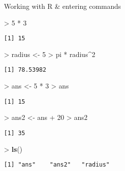 \documentclass[10pt,ignorenonframetext,compress, aspectratio=169]{beamer}
\newenvironment{Shaded}{\begin{snugshade}}{\end{snugshade}}
\newcommand{\KeywordTok}[1]{\textcolor[rgb]{0.13,0.29,0.53}{\textbf{{#1}}}}
\newcommand{\DecValTok}[1]{\textcolor[rgb]{0.00,0.00,0.81}{{#1}}}
\newcommand{\StringTok}[1]{\textcolor[rgb]{0.31,0.60,0.02}{{#1}}}
\newcommand{\NormalTok}[1]{{#1}}
\begin{document}
\begin{frame}[fragile]{Working with R \& entering commands}

\begin{Shaded}
\begin{Highlighting}[]
\NormalTok{>}\StringTok{ }\DecValTok{5} \NormalTok{*}\StringTok{ }\DecValTok{3}
\end{Highlighting}
\end{Shaded}

\begin{verbatim}
[1] 15
\end{verbatim}

\begin{Shaded}
\begin{Highlighting}[]
\NormalTok{>}\StringTok{ }\NormalTok{radius <-}\StringTok{ }\DecValTok{5}
\NormalTok{>}\StringTok{ }\NormalTok{pi *}\StringTok{ }\NormalTok{radius^}\DecValTok{2}
\end{Highlighting}
\end{Shaded}

\begin{verbatim}
[1] 78.53982
\end{verbatim}

\begin{Shaded}
\begin{Highlighting}[]
\NormalTok{>}\StringTok{ }\NormalTok{ans <-}\StringTok{ }\DecValTok{5} \NormalTok{*}\StringTok{ }\DecValTok{3}
\NormalTok{>}\StringTok{ }\NormalTok{ans}
\end{Highlighting}
\end{Shaded}

\begin{verbatim}
[1] 15
\end{verbatim}

\begin{Shaded}
\begin{Highlighting}[]
\NormalTok{>}\StringTok{ }\NormalTok{ans2 <-}\StringTok{ }\NormalTok{ans +}\StringTok{ }\DecValTok{20}
\NormalTok{>}\StringTok{ }\NormalTok{ans2}
\end{Highlighting}
\end{Shaded}

\begin{verbatim}
[1] 35
\end{verbatim}

\begin{Shaded}
\begin{Highlighting}[]
\NormalTok{>}\StringTok{ }\KeywordTok{ls}\NormalTok{()}
\end{Highlighting}
\end{Shaded}

\begin{verbatim}
[1] "ans"    "ans2"   "radius"
\end{verbatim}

\end{frame}
\end{document}
